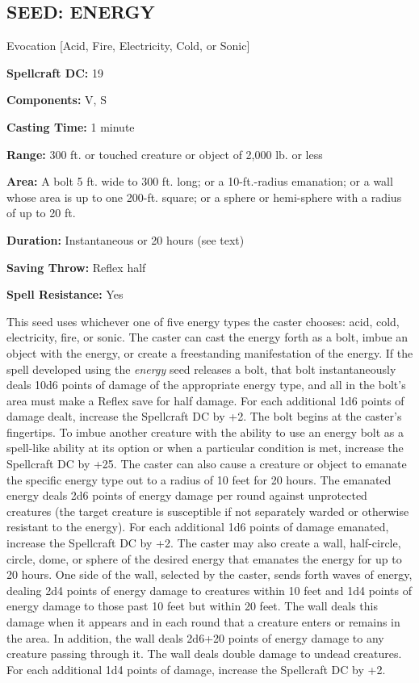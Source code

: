 \documentclass{article}
\begin{document}
\vspace{12pt}
\subsection*{SEED: ENERGY }

Evocation [Acid, Fire, Electricity, Cold, or Sonic] 

\textbf{Spellcraft DC:} 19 

\textbf{Components:} V, S 

\textbf{Casting Time:} 1 minute 

\textbf{Range:} 300 ft. or touched creature or object of 2,000 lb. or less 

\textbf{Area:} A bolt 5 ft. wide to 300 ft. long; or a 10-ft.-radius emanation; 
or a wall whose area is up to one 200-ft. square; or a sphere or hemi-sphere with 
a radius of up to 20 ft. 

\textbf{Duration:} Instantaneous or 20 hours (see text)

\textbf{Saving Throw:} Reflex half 

\textbf{Spell Resistance:} Yes 

This seed uses whichever one of five energy types the caster chooses: acid, cold, 
electricity, fire, or sonic. The caster can cast the energy forth as a bolt, imbue 
an object with the energy, or create a freestanding manifestation of the energy. 
If the spell developed using the \textit{energy }seed releases a bolt, that bolt 
instantaneously deals 10d6 points of damage of the appropriate energy type, and 
all in the bolt's area must make a Reflex save for half damage. For each additional 
1d6 points of damage dealt, increase the Spellcraft DC by +2. The bolt begins at 
the caster's fingertips. To imbue another creature with the ability to use an energy 
bolt as a spell-like ability at its option or when a particular condition is met, 
increase the Spellcraft DC by +25. The caster can also cause a creature or object 
to emanate the specific energy type out to a radius of 10 feet for 20 hours. The 
emanated energy deals 2d6 points of energy damage per round against unprotected 
creatures (the target creature is susceptible if not separately warded or otherwise 
resistant to the energy). For each additional 1d6 points of damage emanated, increase 
the Spellcraft DC by +2. The caster may also create a wall, half-circle, circle, 
dome, or sphere of the desired energy that emanates the energy for up to 20 hours. 
One side of the wall, selected by the caster, sends forth waves of energy, dealing 
2d4 points of energy damage to creatures within 10 feet and 1d4 points of energy 
damage to those past 10 feet but within 20 feet. The wall deals this damage when 
it appears and in each round that a creature enters or remains in the area. In 
addition, the wall deals 2d6+20 points of energy damage to any creature passing 
through it. The wall deals double damage to undead creatures. For each additional 
1d4 points of damage, increase the Spellcraft DC by +2. 
\end{document}
